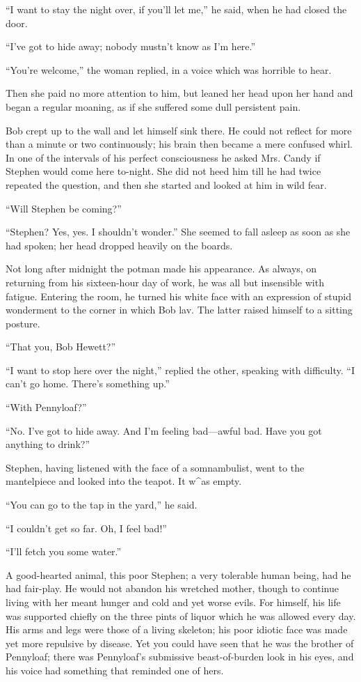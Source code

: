 ``I want to stay the night over, if you'll let me,'' he said, when he
had closed the door.

``I've got to hide away; nobody mustn't know as I'm here.''

``You're welcome,'' the woman replied, in a voice which was horrible to
hear.

{\protect\hypertarget{200}{}{}}Then she paid no more attention to him,
but leaned her head upon her hand and began a regular moaning, as if she
suffered some dull persistent pain.

Bob crept up to the wall and let himself sink there. He could not
reflect for more than a minute or two continuously; his brain then
became a mere confused whirl. In one of the intervals of his perfect
consciousness he asked Mrs. Candy if Stephen would come here to-night.
She did not heed him till he had twice repeated the question, and then
she started and looked at him in wild fear.

``Will Stephen be coming?''

``Stephen? Yes, yes. I shouldn't wonder.'' She seemed to fall asleep as
soon as she had spoken; her head dropped heavily on the boards.

Not long after midnight the potman made his appearance. As always, on
returning from his sixteen-hour day of work, he was all but insensible
with fatigue. Entering the room, he turned his white face with an
expression of stupid wonderment to the corner in which Bob lav. The
latter raised himself to a sitting posture.

{\protect\hypertarget{201}{}{}}``That you, Bob Hewett?''

``I want to stop here over the night,'' replied the other, speaking with
difficulty. ``I can't go home. There's something up.''

``With Pennyloaf?''

``No. I've got to hide away. And I'm feeling bad---awful bad. Have you
got anything to drink?''

Stephen, having listened with the face of a somnambulist, went to the
mantelpiece and looked into the teapot. It w\^{}as empty.

``You can go to the tap in the yard,'' he said.

``I couldn't get so far. Oh, I feel bad!''

``I'll fetch you some water.''

A good-hearted animal, this poor Stephen; a very tolerable human being,
had he had fair-play. He would not abandon his wretched mother, though
to continue living with her meant hunger and cold and yet worse evils.
For himself, his life was supported chiefly on the three pints of liquor
which he was allowed every day. His arms and legs were those of a living
skeleton; his poor idiotic face was made yet more repulsive by disease.
Yet you could have seen that he was the brother of Pennyloaf; there was
Pennyloaf's submissive {\protect\hypertarget{202}{}{}}beast-of-burden
look in his eyes, and his voice had something that reminded one of hers.

